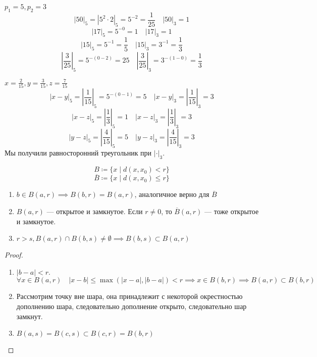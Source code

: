 \begin{example}
	\(p_1 = 5, p_2 = 3\)
	\[|50|_5 = |5^2\cdot 2|_5 = 5^{-2} = \frac{1}{25} \quad |50|_3 = 1\]
	\[|17|_5 = 5^{-0} = 1 \quad |17|_3 = 1\]
	\[|15|_5 = 5^{-1} = \frac{1}{5} \quad |15|_3 = 3^{-1} = \frac{1}{3}\]
	\[\left|\frac{3}{25}\right|_5 = 5^{-(0-2)} = 25 \quad \left|\frac{3}{25}\right|_3 = 3^{-(1-0)} = \frac{1}{3}\]
\end{example}

\begin{example}
	\(x = \frac{2}{15}, y = \frac{3}{15}, z = \frac{7}{15}\)
	\[|x-y|_5 = \left|\frac{1}{15}\right|_5 = 5^{-(0-1)} = 5
		\quad |x-y|_3 = \left|\frac{1}{15}\right|_3 = 3\]
	\[|x-z|_5 = \left|\frac{1}{3}\right|_5 = 1
		\quad |x-z|_3 = \left|\frac{1}{3}\right|_3 = 3\]
	\[|y-z|_5 = \left|\frac{4}{15}\right|_5 = 5
		\quad |y-z|_3 = \left|\frac{4}{15}\right|_3 = 3\]
	Мы получили равносторонний треугольник при \(|\cdot|_3\).
\end{example}

\begin{definition}
	\[B \coloneqq \{x \mid d(x, x_0) < r\}\]
	\[\overline{B} \coloneqq \{x \mid d(x, x_0) \le r\}\]
\end{definition}

\begin{lemma}\itemfix
	\begin{enumerate}
		\item \(b \in B(a, r) \implies B(b, r) = B(a, r)\), аналогичное верно для \(\overline{B}\)
		\item \(B(a, r)\) --- открытое и замкнутое. Если \(r \neq 0\), то \(\overline{B}(a, r)\) --- тоже открытое и замкнутое.
		\item \(r > s, B(a, r) \cap B(b, s) \neq \emptyset \implies B(b, s) \subset B(a, r)\)
	\end{enumerate}
\end{lemma}
\begin{proof}\itemfix
	\begin{enumerate}
		\item \(|b-a| < r\).
		      \[\forall x \in B(a, r) \quad |x-b| \le \max(|x-a|, |b-a|) < r \implies x \in B(b, r) \implies B(a, r) \subset B(b, r)\]
		\item Рассмотрим точку вне шара, она принадлежит с некоторой окрестностью дополнению шара, следовательно дополнение открыто, следовательно шар замкнут.
		\item \(B(a, s) = B(c, s) \subset B(c, r) = B(b, r)\)
	\end{enumerate}
\end{proof}

